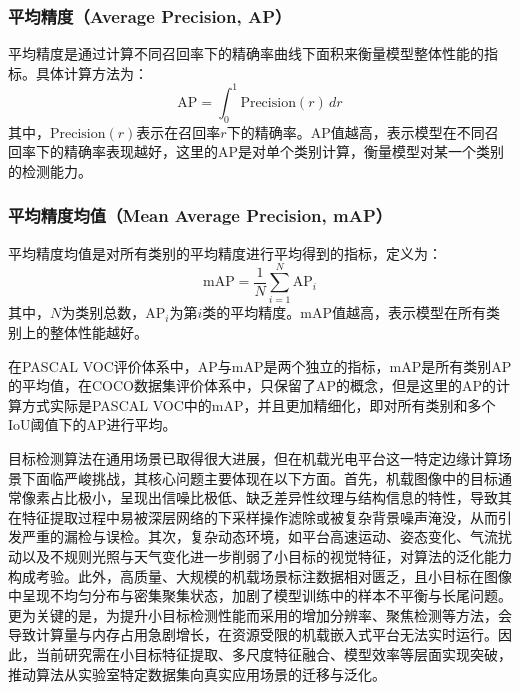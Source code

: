 \subsubsection{平均精度（Average Precision, AP）}
平均精度是通过计算不同召回率下的精确率曲线下面积来衡量模型整体性能的指标。具体计算方法为：
\begin{equation}
    \text{AP} = \int_0^1 \text{Precision}(r) \, dr
\end{equation}
其中，$\text{Precision}(r)$表示在召回率$r$下的精确率。AP值越高，表示模型在不同召回率下的精确率表现越好，这里的AP是对单个类别计算，衡量模型对某一个类别的检测能力。

\subsubsection{平均精度均值（Mean Average Precision, mAP）}
平均精度均值是对所有类别的平均精度进行平均得到的指标，定义为：
\begin{equation}
    \text{mAP} = \frac{1}{N} \sum_{i=1}^{N} \text{AP}_i
\end{equation}
其中，$N$为类别总数，$\text{AP}_i$为第$i$类的平均精度。mAP值越高，表示模型在所有类别上的整体性能越好。

在PASCAL VOC评价体系中，AP与mAP是两个独立的指标，mAP是所有类别AP的平均值，在COCO数据集评价体系中，只保留了AP的概念，但是这里的AP的计算方式实际是PASCAL VOC中的mAP，并且更加精细化，即对所有类别和多个IoU阈值下的AP进行平均。

目标检测算法在通用场景已取得很大进展，但在机载光电平台这一特定边缘计算场景下面临严峻挑战，其核心问题主要体现在以下方面。首先，机载图像中的目标通常像素占比极小，呈现出信噪比极低、缺乏差异性纹理与结构信息的特性，导致其在特征提取过程中易被深层网络的下采样操作滤除或被复杂背景噪声淹没，从而引发严重的漏检与误检。其次，复杂动态环境，如平台高速运动、姿态变化、气流扰动以及不规则光照与天气变化进一步削弱了小目标的视觉特征，对算法的泛化能力构成考验。此外，高质量、大规模的机载场景标注数据相对匮乏，且小目标在图像中呈现不均匀分布与密集聚集状态，加剧了模型训练中的样本不平衡与长尾问题。更为关键的是，为提升小目标检测性能而采用的增加分辨率、聚焦检测等方法，会导致计算量与内存占用急剧增长，在资源受限的机载嵌入式平台无法实时运行。因此，当前研究需在小目标特征提取、多尺度特征融合、模型效率等层面实现突破，推动算法从实验室特定数据集向真实应用场景的迁移与泛化。


